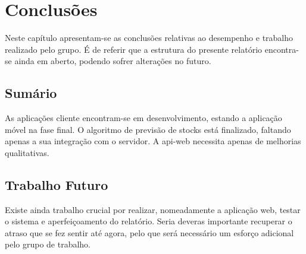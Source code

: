 %
%
\chapter{Conclusões} \label{cap4}

Neste capítulo apresentam-se as conclusões relativas ao desempenho e trabalho realizado pelo grupo. É de referir que a estrutura do presente relatório encontra-se ainda em aberto, podendo sofrer alterações no futuro.

\section{Sumário}\label{sec41}

As aplicações cliente encontram-se em desenvolvimento, estando a aplicação móvel na fase final. O algoritmo de previsão de stocks está finalizado, faltando apenas a sua integração com o servidor. A \gls{api-web} necessita apenas de melhorias qualitativas.

\section{Trabalho Futuro}\label{sec42}

Existe ainda trabalho crucial por realizar, nomeadamente a aplicação web, testar o sistema e aperfeiçoamento do relatório. Seria deveras importante recuperar o atraso que se fez sentir até agora, pelo que será necessário um esforço adicional pelo grupo de trabalho.